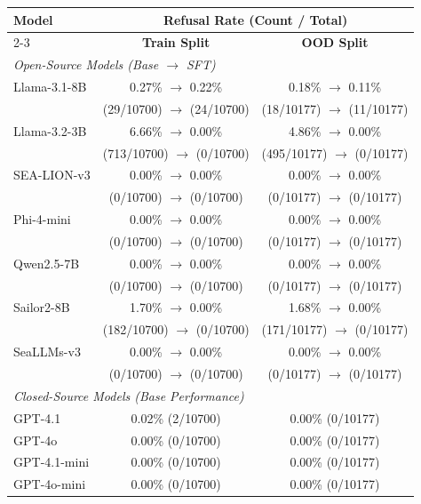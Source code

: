 \begin{tabular}{l|cc}
\toprule
\multirow{2}{*}{\textbf{Model}} & \multicolumn{2}{c}{\textbf{Refusal Rate (Count / Total)}} \\
\cmidrule(lr){2-3}
& \textbf{Train Split} & \textbf{OOD Split} \\
\midrule
\multicolumn{3}{l}{\textit{Open-Source Models (Base $\rightarrow$ SFT)}} \\
\midrule
Llama-3.1-8B & 0.27\% $\rightarrow$ 0.22\% & 0.18\% $\rightarrow$ 0.11\% \\
 & \scriptsize{(29/10700) $\rightarrow$ (24/10700)} & \scriptsize{(18/10177) $\rightarrow$ (11/10177)} \\
\midrule
Llama-3.2-3B & 6.66\% $\rightarrow$ 0.00\% & 4.86\% $\rightarrow$ 0.00\% \\
 & \scriptsize{(713/10700) $\rightarrow$ (0/10700)} & \scriptsize{(495/10177) $\rightarrow$ (0/10177)} \\
\midrule
SEA-LION-v3 & 0.00\% $\rightarrow$ 0.00\% & 0.00\% $\rightarrow$ 0.00\% \\
 & \scriptsize{(0/10700) $\rightarrow$ (0/10700)} & \scriptsize{(0/10177) $\rightarrow$ (0/10177)} \\
\midrule
Phi-4-mini & 0.00\% $\rightarrow$ 0.00\% & 0.00\% $\rightarrow$ 0.00\% \\
 & \scriptsize{(0/10700) $\rightarrow$ (0/10700)} & \scriptsize{(0/10177) $\rightarrow$ (0/10177)} \\
\midrule
Qwen2.5-7B & 0.00\% $\rightarrow$ 0.00\% & 0.00\% $\rightarrow$ 0.00\% \\
 & \scriptsize{(0/10700) $\rightarrow$ (0/10700)} & \scriptsize{(0/10177) $\rightarrow$ (0/10177)} \\
\midrule
Sailor2-8B & 1.70\% $\rightarrow$ 0.00\% & 1.68\% $\rightarrow$ 0.00\% \\
 & \scriptsize{(182/10700) $\rightarrow$ (0/10700)} & \scriptsize{(171/10177) $\rightarrow$ (0/10177)} \\
\midrule
SeaLLMs-v3 & 0.00\% $\rightarrow$ 0.00\% & 0.00\% $\rightarrow$ 0.00\% \\
 & \scriptsize{(0/10700) $\rightarrow$ (0/10700)} & \scriptsize{(0/10177) $\rightarrow$ (0/10177)} \\
\midrule
\multicolumn{3}{l}{\textit{Closed-Source Models (Base Performance)}} \\
\midrule
GPT-4.1 & 0.02\% \scriptsize{(2/10700)} & 0.00\% \scriptsize{(0/10177)} \\
GPT-4o & 0.00\% \scriptsize{(0/10700)} & 0.00\% \scriptsize{(0/10177)} \\
GPT-4.1-mini & 0.00\% \scriptsize{(0/10700)} & 0.00\% \scriptsize{(0/10177)} \\
GPT-4o-mini & 0.00\% \scriptsize{(0/10700)} & 0.00\% \scriptsize{(0/10177)} \\
\bottomrule
\end{tabular}
